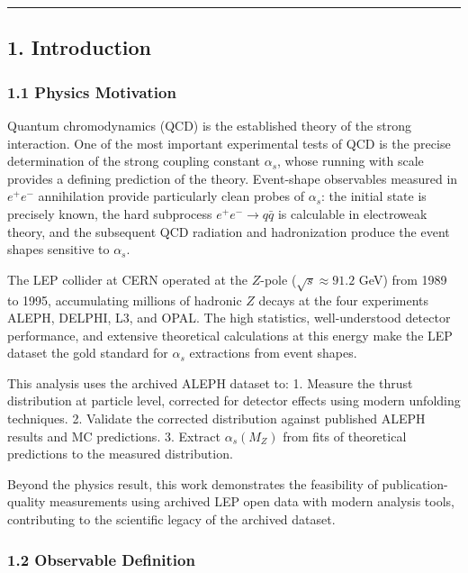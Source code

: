 \documentclass[11pt,]{article}
\begin{document}
\begin{center}\rule{0.5\linewidth}{\linethickness}\end{center}

\hypertarget{introduction}{%
\subsection{1. Introduction}\label{introduction}}

\hypertarget{physics-motivation}{%
\subsubsection{1.1 Physics Motivation}\label{physics-motivation}}

Quantum chromodynamics (QCD) is the established theory of the strong
interaction. One of the most important experimental tests of QCD is the
precise determination of the strong coupling constant \(\alpha_s\),
whose running with scale provides a defining prediction of the theory.
Event-shape observables measured in \(e^+e^-\) annihilation provide
particularly clean probes of \(\alpha_s\): the initial state is
precisely known, the hard subprocess \(e^+e^- \to q\bar{q}\) is
calculable in electroweak theory, and the subsequent QCD radiation and
hadronization produce the event shapes sensitive to \(\alpha_s\).

The LEP collider at CERN operated at the \(Z\)-pole
(\(\sqrt{s} \approx 91.2\) GeV) from 1989 to 1995, accumulating millions
of hadronic \(Z\) decays at the four experiments ALEPH, DELPHI, L3, and
OPAL. The high statistics, well-understood detector performance, and
extensive theoretical calculations at this energy make the LEP dataset
the gold standard for \(\alpha_s\) extractions from event shapes.

This analysis uses the archived ALEPH dataset to: 1. Measure the thrust
distribution at particle level, corrected for detector effects using
modern unfolding techniques. 2. Validate the corrected distribution
against published ALEPH results and MC predictions. 3. Extract
\(\alpha_s(M_Z)\) from fits of theoretical predictions to the measured
distribution.

Beyond the physics result, this work demonstrates the feasibility of
publication-quality measurements using archived LEP open data with
modern analysis tools, contributing to the scientific legacy of the
archived dataset.

\hypertarget{observable-definition}{%
\subsubsection{1.2 Observable Definition}\label{observable-definition}}
\end{document}
